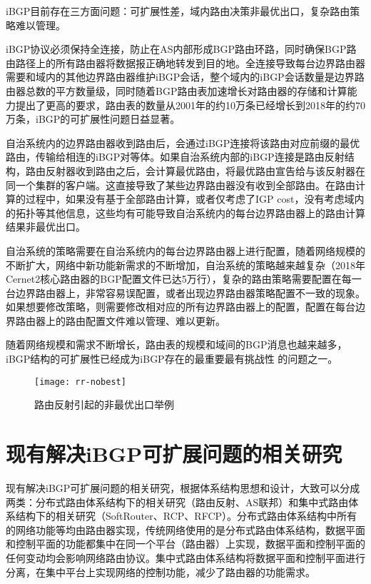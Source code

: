 iBGP\cite{Oprescu2011Rethinking}目前存在三方面问题：可扩展性差，域内路由决策非最优出口，复杂路由策略难以管理。

iBGP协议必须保持全连接，防止在AS内部形成BGP路由环路，同时确保BGP路由路径上的所有路由器将数据报正确地转发到目的地。全连接导致每台边界路由器需要和域内的其他边界路由器维护iBGP会话，整个域内的iBGP会话数量是边界路由器总数的平方数量级，同时随着BGP路由表加速增长对路由器的存储和计算能力提出了更高的要求，路由表的数量从2001年的约10万条已经增长到2018年的约70万条，iBGP的可扩展性问题日益显著。

自治系统内的边界路由器收到路由后，会通过iBGP连接将该路由对应前缀的最优路由，传输给相连的iBGP对等体。如果自治系统内部的iBGP连接是路由反射结构，路由反射器收到路由之后，会计算最优路由，将最优路由宣告给与该反射器在同一个集群的客户端。这直接导致了某些边界路由器没有收到全部路由。在路由计算的过程中，如果没有基于全部路由计算，或者仅考虑了IGP cost，没有考虑域内的拓扑等其他信息，这些均有可能导致自治系统内的每台边界路由器上的路由计算结果非最优出口。

自治系统的策略需要在自治系统内的每台边界路由器上进行配置，随着网络规模的不断扩大，网络中新功能新需求的不断增加，自治系统的策略越来越复杂（2018年Cernet2核心路由器的BGP配置文件已达5万行），复杂的路由策略需要配置在每一台边界路由器上，非常容易误配置，或者出现边界路由器策略配置不一致的现象。如果想要修改策略，则需要修改相对应的所有边界路由器上的配置，配置在每台边界路由器上的路由配置文件难以管理、难以更新。

随着网络规模和需求不断增长，路由表的规模和域间的BGP消息也越来越多，iBGP结构的可扩展性已经成为iBGP存在的最重要最有挑战性 的问题之一。

\begin{figure}
  \centering
  \texttt{[image: rr-nobest]}
  \caption{路由反射引起的非最优出口举例\cite{Feamster2004The}}
  \label{fig:rr-nobest}
\end{figure}

\section{现有解决iBGP可扩展问题的相关研究}
现有解决iBGP可扩展问题的相关研究，根据体系结构思想和设计，大致可以分成两类：分布式路由体系结构下的相关研究（路由反射\cite{rfc2796}、AS联邦\cite{rfc1965}）和集中式路由体系结构下的相关研究（SoftRouter\cite{lakshman2004}、RCP\cite{Feamster2004The}、RFCP\cite{RothenbergHotSDN}）。分布式路由体系结构中所有的网络功能等均由路由器实现，传统网络使用的是分布式路由体系结构，数据平面和控制平面的功能都集中在同一个平台（路由器）上实现，数据平面和控制平面的任何变动均会影响网络路由协议。集中式路由体系结构\cite{centralization}将数据平面和控制平面进行分离，在集中平台上实现网络的控制功能，减少了路由器的功能需求。

